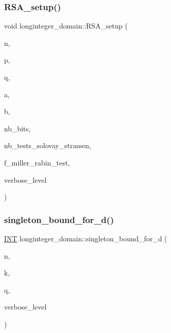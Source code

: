 \subsubsection{\texorpdfstring{R\+S\+A\+\_\+setup()}{RSA\_setup()}}
{\footnotesize\ttfamily void longinteger\+\_\+domain\+::\+R\+S\+A\+\_\+setup (\begin{DoxyParamCaption}\item[{\mbox{\hyperlink{classlonginteger__object}{longinteger\+\_\+object}} \&}]{n,  }\item[{\mbox{\hyperlink{classlonginteger__object}{longinteger\+\_\+object}} \&}]{p,  }\item[{\mbox{\hyperlink{classlonginteger__object}{longinteger\+\_\+object}} \&}]{q,  }\item[{\mbox{\hyperlink{classlonginteger__object}{longinteger\+\_\+object}} \&}]{a,  }\item[{\mbox{\hyperlink{classlonginteger__object}{longinteger\+\_\+object}} \&}]{b,  }\item[{\mbox{\hyperlink{galois_8h_a09fddde158a3a20bd2dcadb609de11dc}{I\+NT}}}]{nb\+\_\+bits,  }\item[{\mbox{\hyperlink{galois_8h_a09fddde158a3a20bd2dcadb609de11dc}{I\+NT}}}]{nb\+\_\+tests\+\_\+solovay\+\_\+strassen,  }\item[{\mbox{\hyperlink{galois_8h_a09fddde158a3a20bd2dcadb609de11dc}{I\+NT}}}]{f\+\_\+miller\+\_\+rabin\+\_\+test,  }\item[{\mbox{\hyperlink{galois_8h_a09fddde158a3a20bd2dcadb609de11dc}{I\+NT}}}]{verbose\+\_\+level }\end{DoxyParamCaption})}

\mbox{\label{classlonginteger__domain_ae86c607c23d4d9a54d4581ced95838b3}} 
\subsubsection{\texorpdfstring{singleton\+\_\+bound\+\_\+for\+\_\+d()}{singleton\_bound\_for\_d()}}
{\footnotesize\ttfamily \mbox{\hyperlink{galois_8h_a09fddde158a3a20bd2dcadb609de11dc}{I\+NT}} longinteger\+\_\+domain\+::singleton\+\_\+bound\+\_\+for\+\_\+d (\begin{DoxyParamCaption}\item[{\mbox{\hyperlink{galois_8h_a09fddde158a3a20bd2dcadb609de11dc}{I\+NT}}}]{n,  }\item[{\mbox{\hyperlink{galois_8h_a09fddde158a3a20bd2dcadb609de11dc}{I\+NT}}}]{k,  }\item[{\mbox{\hyperlink{galois_8h_a09fddde158a3a20bd2dcadb609de11dc}{I\+NT}}}]{q,  }\item[{\mbox{\hyperlink{galois_8h_a09fddde158a3a20bd2dcadb609de11dc}{I\+NT}}}]{verbose\+\_\+level }\end{DoxyParamCaption})}

